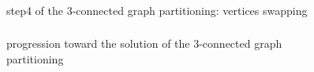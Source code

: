 \begin{frame}
 \begin{figure}[H]
 \frametitle{}
	\begin{center}
	  
	\end{center}
	\caption{step4 of the 3-connected graph partitioning: vertices swapping}
      \end{figure}
\end{frame}

\begin{frame}
 \begin{figure}[H]
 \frametitle{}
	\begin{center}
	  
	\end{center}
	\caption{progression toward the solution of the 3-connected graph partitioning}
      \end{figure}
\end{frame}
